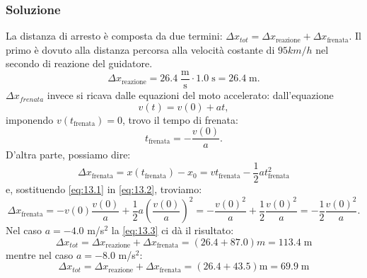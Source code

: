 \documentclass[12pt,a4paper]{book}
\begin{document}
\subsubsection*{Soluzione}
La distanza di arresto è composta da due termini: $\Delta x_{tot}=\Delta x_{\text{reazione}}+\Delta x_{\text{frenata}}$. Il primo è dovuto alla distanza percorsa alla velocità costante di $95 km/h$ nel secondo di reazione del guidatore.
\begin{equation}
\Delta x_{\text{reazione}}=26.4 \; \frac{\text{m}}{\text{s}}\cdot 1.0 \;\text{s}=26.4 \;\text{m}.
\end{equation}
$\Delta x_{frenata}$ invece si ricava dalle equazioni del moto accelerato: dall'equazione
\begin{equation*}
v(t)=v(0)+a t,
\end{equation*}
imponendo $v(t_{\text{frenata}})=0$, trovo il tempo di frenata:
\begin{equation}
t_{\text{frenata}}=-\frac{v(0)}{a}.
\label{eq:13.1}
\end{equation}
D'altra parte, possiamo dire:
\begin{equation}
\Delta x_{\text{frenata}}= x(t_{\text{frenata}})-x_{0}= v t_{\text{frenata}}- \frac{1}{2}a t_{\text{frenata}}^2
\label{eq:13.2}
\end{equation}
e, sostituendo \ref{eq:13.1} in \ref{eq:13.2}, troviamo:
\begin{equation}
\Delta x_{\text{frenata}}=- v(0)\frac{v(0)}{a}+\frac{1}{2}a \left (\frac{v(0)}{a}\right )^2=-\frac{v(0)^2}{a}+\frac{1}{2}\frac{v(0)^{2}}{a}=-\frac{1}{2}\frac{v(0)^2}{a}.
\label{eq:13.3}
\end{equation}
Nel caso $a=-4.0$ m/s$^2$ la \ref{eq:13.3} ci dà il risultato:
\begin{equation*}
\Delta x_{tot}=\Delta x_{\text{reazione}}+\Delta x_{\text{frenata}}=(26.4+87.0) m=113.4 \;\text{m}
\end{equation*}
mentre nel caso $a=-8.0$ m/s$^2$:
\begin{equation*}
\Delta x_{tot}=\Delta x_{\text{reazione}}+\Delta x_{\text{frenata}}=(26.4+43.5) \text{m}=69.9 \; \text{m}
\end{equation*}
\end{document}
